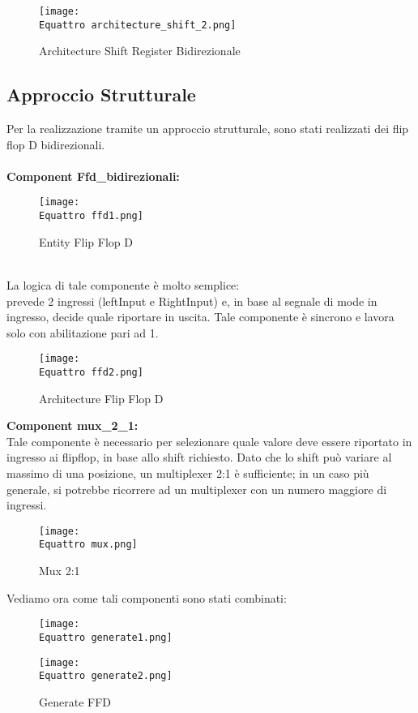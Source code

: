 \documentclass[12pt]{article}
\def \Equattro {Allegati/Esercizio4/}
\begin{document}
\begin{figure}[ht!]
    \centering
    \texttt{[image: \\Equattro architecture\_shift\_2.png]}
    \caption{Architecture Shift Register Bidirezionale}
\end{figure}
\clearpage
\subsection{Approccio Strutturale}
Per la realizzazione tramite un approccio strutturale, sono stati realizzati dei flip flop D bidirezionali.
\\\\{\large \textbf{Component Ffd\_bidirezionali:}}
\begin{figure}[ht]
    \centering
    \texttt{[image: \\Equattro ffd1.png]}
    \caption{Entity Flip Flop D}
\end{figure}
\\La logica di tale componente è molto semplice:
\\prevede 2 ingressi (leftInput e RightInput) e, in base al segnale di mode in ingresso, decide quale riportare in uscita. Tale componente è sincrono e lavora solo con abilitazione pari ad 1.
\clearpage
\begin{figure}[ht]
    \centering
    \texttt{[image: \\Equattro ffd2.png]}
    \caption{Architecture Flip Flop D}
\end{figure}
{\large \textbf{Component mux\_2\_1:}}
\\Tale componente è necessario per selezionare quale valore deve essere riportato in ingresso ai flipflop, in base allo shift richiesto.
Dato che lo shift può variare al massimo di una posizione, un multiplexer 2:1 è sufficiente; in un caso più generale, si potrebbe ricorrere ad un multiplexer con un numero maggiore di ingressi.
\clearpage
\begin{figure}[ht]
    \centering
    \texttt{[image: \\Equattro mux.png]}
    \caption{Mux 2:1}
\end{figure}
Vediamo ora come tali componenti sono stati combinati:
\clearpage
\begin{figure}[ht!]
    \centering
    \texttt{[image: \\Equattro generate1.png]}
\end{figure}
\begin{figure}[ht!]
    \centering
    \texttt{[image: \\Equattro generate2.png]}
    \caption{ Generate FFD}
\end{figure}
\end{document}
